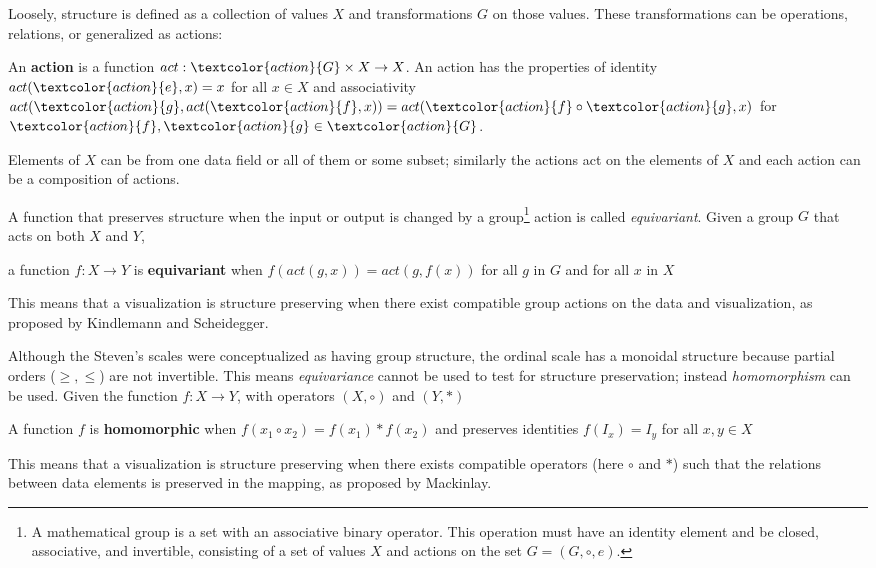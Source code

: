 Loosely, structure is defined as a collection of values $X$ and transformations $G$ on those values. These transformations can be operations, relations, or generalized as actions:
\begin{definition}\label{def:related-work:action}
  An \textcolor{action}{\textbf{action}} is a function  $act: \textcolor{action}{G} \times X \rightarrow X$. An action has the properties of identity $act(\textcolor{action}{e}, x) = x$ for all  $x \in X$ and associativity $act(\textcolor{action}{g}, act(\textcolor{action}{f}, x)) = act(\textcolor{action}{f} \circ \textcolor{action}{g}, x)$ for $\textcolor{action}{f},\textcolor{action}{g} \in \textcolor{action}{G}$.\cite{grimaldiDiscreteCombinatorialMathematics2006}
\end{definition}
Elements of $X$ can be from one data field or all of them or some subset; similarly the actions act on the elements of $X$ and each action can be a composition of actions.

A function that preserves structure when the input or output is changed by a group\footnote{A mathematical {group} is a set with an associative binary operator. This operation must have an identity element and be closed, associative, and invertible, consisting of a set of values $X$ and \textcolor{action}{actions} on the set {$G = (G,\circ, e)$}.} action is called \textit{equivariant}.  Given a group $G$ that acts on both $X$ and $Y$, 
\begin{definition}\label{def:equivariance}
 a function $f: X \rightarrow Y$ is \textbf{equivariant} when $f(act(g,x)) = act(g,f(x))$ for all $g$ in $G$ and for all $x$ in $X$ \cite{pittsNominalSetsNames2013}
\end{definition}
This means that a visualization is structure preserving when there exist compatible group actions on the data and visualization, as proposed by Kindlemann and Scheidegger\cite{kindlmannAlgebraicProcessVisualization2014}. 

Although the Steven's scales were conceptualized as having group structure, the ordinal scale has a monoidal structure because partial orders ($\geq, \leq$) are not invertible. This means \textit{equivariance} cannot be used to test for structure preservation; instead \textit{homomorphism} can be used. Given the function $f: X \rightarrow Y$, with operators $(X, \circ)$ and $(Y, *)$
\begin{definition}\label{def:homomorphism}
  A function $f$ is \textbf{homomorphic} when $f(x_1 \circ x_2) = f(x_1) * f(x_2)$ and preserves identities $f(I_x) = I_y$ for all $x, y \in X$ \cite{grimaldiDiscreteCombinatorialMathematics2006}
\end{definition}
This means that a visualization is structure preserving when there
exists compatible operators (here $\circ$ and $*$) such that the relations between data elements is preserved in the mapping, 
as proposed by Mackinlay\cite{mackinlayAutomaticDesignGraphical1987}.

